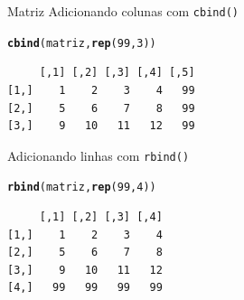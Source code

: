 \documentclass[10pt,handout]{beamer}\usepackage[]{graphicx}\usepackage[]{color}
\makeatletter
\newcommand{\hlnum}[1]{\textcolor[rgb]{0.686,0.059,0.569}{#1}}%
\newcommand{\hlstd}[1]{\textcolor[rgb]{0.345,0.345,0.345}{#1}}%
\newcommand{\hlkwd}[1]{\textcolor[rgb]{0.282,0.239,0.545}{\textbf{#1}}}%
\newenvironment{kframe}{%
 \def\at@end@of@kframe{}%
 \ifinner\ifhmode%
  \def\at@end@of@kframe{\end{minipage}}%
  \begin{minipage}{\columnwidth}%
 \fi\fi%
 \def\FrameCommand##1{\hskip\@totalleftmargin \hskip-\fboxsep
 \colorbox{shadecolor}{##1}\hskip-\fboxsep
     \hskip-\linewidth \hskip-\@totalleftmargin \hskip\columnwidth}%
 \MakeFramed {\advance\hsize-\width
   \@totalleftmargin\z@ \linewidth\hsize
   \@setminipage}}%
 {\par\unskip\endMakeFramed%
 \at@end@of@kframe}
\newenvironment{knitrout}{}{} %
\makeatother
\begin{document}
\begin{frame}[fragile]{Matriz}
Adicionando colunas com \verb|cbind()|
\begin{knitrout}\small
{}\color{fgcolor}\begin{kframe}
\begin{alltt}
\hlkwd{cbind}\hlstd{(matriz,} \hlkwd{rep}\hlstd{(}\hlnum{99}\hlstd{,} \hlnum{3}\hlstd{))}
\end{alltt}
\begin{verbatim}
     [,1] [,2] [,3] [,4] [,5]
[1,]    1    2    3    4   99
[2,]    5    6    7    8   99
[3,]    9   10   11   12   99
\end{verbatim}
\end{kframe}
\end{knitrout}

Adicionando linhas com \verb|rbind()|
\begin{knitrout}\small
{}\color{fgcolor}\begin{kframe}
\begin{alltt}
\hlkwd{rbind}\hlstd{(matriz,} \hlkwd{rep}\hlstd{(}\hlnum{99}\hlstd{,} \hlnum{4}\hlstd{))}
\end{alltt}
\begin{verbatim}
     [,1] [,2] [,3] [,4]
[1,]    1    2    3    4
[2,]    5    6    7    8
[3,]    9   10   11   12
[4,]   99   99   99   99
\end{verbatim}
\end{kframe}
\end{knitrout}

\end{frame}
\end{document}
